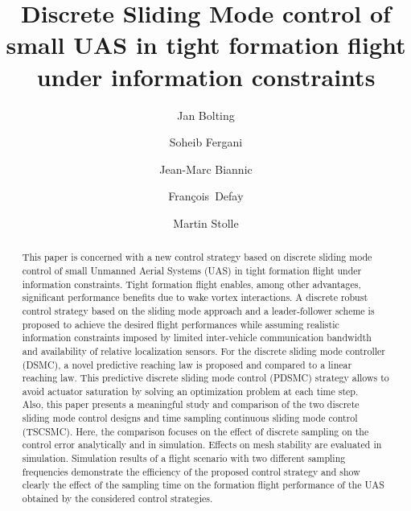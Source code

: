 \documentclass{ifacconf}
\newcommand{\Francois}{\mbox{Fran\c{c}ois Defa$\ddot{\textrm{y}}$}}
\begin{document}
\begin{frontmatter}

\title{Discrete Sliding Mode control of small UAS in tight formation flight under information constraints}

\author[First]{Jan Bolting}
\author[First]{Soheib Fergani}
\author[Second]{Jean-Marc Biannic}
\author[First]{\Francois}
\author[Second]{Martin Stolle}

\address[First]{Institut Supérieur de l'Aéronautique et de l'Espace (ISAE),
   31055 Toulouse, France (e-mail: jan.bolting@isae.fr, soheib.fergani@isae.fr, francois.defay@isae.fr)}
\address[Second]{Office National d'Études et de Recherches Aérospatiales (ONERA),
   31055 Toulouse, France (e-mail: jean-marc.biannic@onera.fr, martin.stolle@onera.fr)}
   

\begin{abstract}
This paper is concerned with a new control strategy  based on discrete sliding mode control of small Unmanned Aerial Systems (UAS) in tight formation flight under information constraints. 
Tight formation flight enables, among other advantages, significant performance benefits due to wake vortex interactions. 
A discrete robust control strategy based on the sliding mode approach and a leader-follower scheme is proposed to achieve the desired flight performances while assuming realistic information constraints imposed by limited inter-vehicle communication bandwidth and availability of relative localization sensors.
For the discrete sliding mode controller (DSMC), a novel predictive reaching law is proposed and compared to a linear reaching law. This predictive discrete sliding mode control (PDSMC) strategy allows to avoid actuator saturation by solving an optimization problem at each time step.\\
Also, this paper presents a meaningful study and comparison of the two discrete sliding mode control designs and  time sampling continuous sliding mode control (TSCSMC). 
Here, the comparison focuses on the effect of discrete sampling on the control error analytically and in simulation. Effects on mesh stability are evaluated in simulation.
Simulation results of a flight scenario with two different sampling frequencies demonstrate the efficiency of the proposed control strategy and show clearly the effect of the sampling time on the formation flight performance of the UAS obtained by the considered control strategies.


\end{abstract}
\end{frontmatter}
\end{document}
